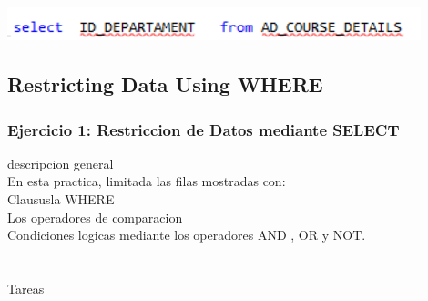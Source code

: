 \documentclass[12pt,letterpaper]{article}
\begin{document}
\begin{center}
\includegraphics[width=12cm]{./IMAGENES/imagen6_2_5}
\end{center}

     










\newpage
\subsection{Restricting Data Using WHERE} 
\subsubsection{Ejercicio 1: Restriccion de Datos mediante SELECT} 
descripcion general  \\
En esta practica, limitada las filas mostradas con:\\
Claususla WHERE\\
Los operadores de comparacion\\
Condiciones logicas mediante los operadores AND , OR y NOT.\\
\\
\\Tareas
\end{document}
